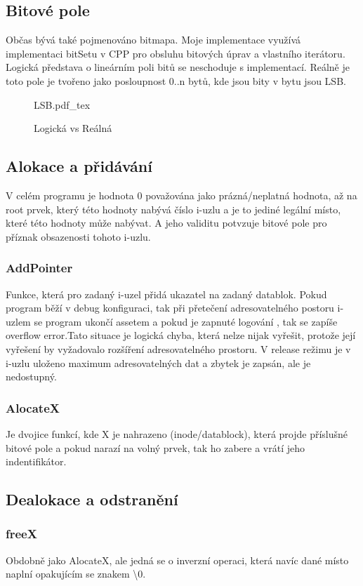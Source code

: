 \documentclass[12pt, a4paper]{report}
\newcommand{\incfig}[1]{%
    \def\svgwidth{\columnwidth}
    {#1.pdf_tex}
}
\begin{document}
\subsection{Bitové pole}
Občas bývá také pojmenováno bitmapa. Moje implementace využívá implementaci bitSetu v CPP pro obsluhu bitových úprav a vlastního iterátoru. Logická představa o lineárním poli bitů se neschoduje s implementací. Reálně je toto pole je tvořeno jako posloupnost 0..n bytů, kde jsou bity v bytu jsou LSB.
\begin{figure}[H]
 \centering
 \incfig{LSB}
 \caption{Logická vs Reálná}
\end{figure}
\subsection{Alokace a přidávání}
V celém programu je hodnota 0 považována jako prázná/neplatná hodnota, až na root prvek, který této hodnoty nabývá číslo i-uzlu a je to jediné legální místo, které této hodnoty může nabývat. A jeho validitu potvzuje bitové pole pro příznak obsazenosti tohoto i-uzlu.
\subsubsection{AddPointer}
Funkce, která pro zadaný i-uzel přidá ukazatel na zadaný datablok. Pokud program běží v debug konfiguraci, tak při přetečení adresovatelného postoru i-uzlem se program ukončí  assetem a pokud je zapnuté logování , tak se zapíše overflow error.Tato situace je logická chyba, která nelze nijak vyřešit, protože její vyřešení by vyžadovalo rozšíření adresovatelného prostoru. V release režimu je v i-uzlu uloženo maximum adresovatelných dat a zbytek je zapsán, ale je nedostupný.
\subsubsection{AlocateX}
Je dvojice funkcí, kde X je nahrazeno (inode/datablock), která projde příslušné bitové pole a pokud narazí na volný prvek, tak ho zabere a vrátí jeho indentifikátor.
\subsection{Dealokace a odstranění}
\subsubsection{freeX}
Obdobně jako AlocateX, ale jedná se o inverzní operaci, která navíc dané místo naplní opakujícím se znakem \textbackslash0.
\end{document}

